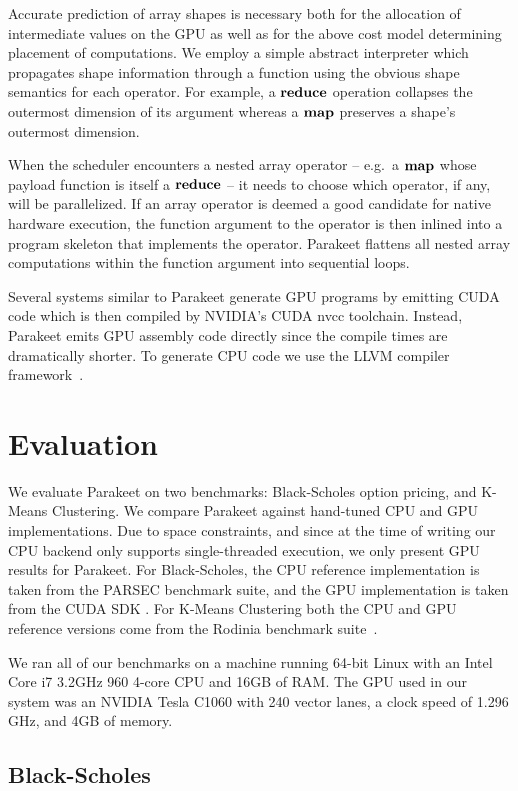 \documentclass[10pt,twocolumn]{article}
\begin{document}
Accurate prediction of array shapes is necessary both for the allocation of intermediate values on the GPU as well as for the above cost model determining placement of computations. We employ a simple abstract interpreter which propagates shape information through a function using the obvious shape semantics for each operator. For example, a $\mbox{\textbf{reduce}}$ operation collapses the outermost dimension of its argument whereas a $\mbox{\textbf{map}}$ preserves a shape's outermost dimension.

When the scheduler encounters a nested array operator -- e.g.~a $\mbox{\textbf{map}}$ whose payload function is itself a $\mbox{\textbf{reduce}}$ -- it needs to choose which operator, if any, will be parallelized.  If an array operator is deemed a good candidate for native hardware execution, the function argument to the operator is then inlined into a program skeleton that implements the operator. Parakeet flattens all nested array computations within the function argument into sequential loops.

Several systems similar to Parakeet \cite{Cata11,Chaf11} generate GPU programs by emitting CUDA code which is then compiled by NVIDIA's CUDA nvcc toolchain. Instead, Parakeet emits GPU assembly code directly since the compile times are dramatically shorter. To generate CPU code we use the LLVM compiler framework~\cite{Latt02}.

\section{Evaluation}
\label{Evaluation}

We evaluate Parakeet on two benchmarks: Black-Scholes option pricing, and K-Means Clustering.  We compare Parakeet against hand-tuned CPU and GPU implementations.  Due to space constraints, and since at the time of writing our CPU backend only supports single-threaded execution, we only present GPU results for Parakeet.  For Black-Scholes, the CPU reference implementation is taken from the PARSEC \cite{Bien08} benchmark suite, and the GPU implementation is taken from the CUDA SDK \cite{NvidSD}.  For K-Means Clustering both the CPU and GPU reference versions come from the Rodinia benchmark suite~\cite{Che09}.

We ran all of our benchmarks on a machine running 64-bit Linux with an Intel Core i7 3.2GHz 960 4-core CPU  and 16GB of RAM.  The GPU used in our system was an NVIDIA Tesla C1060 with 240 vector lanes, a clock speed of 1.296 GHz, and 4GB of memory.

\subsection{Black-Scholes}
\label{results-bs}
\end{document}
